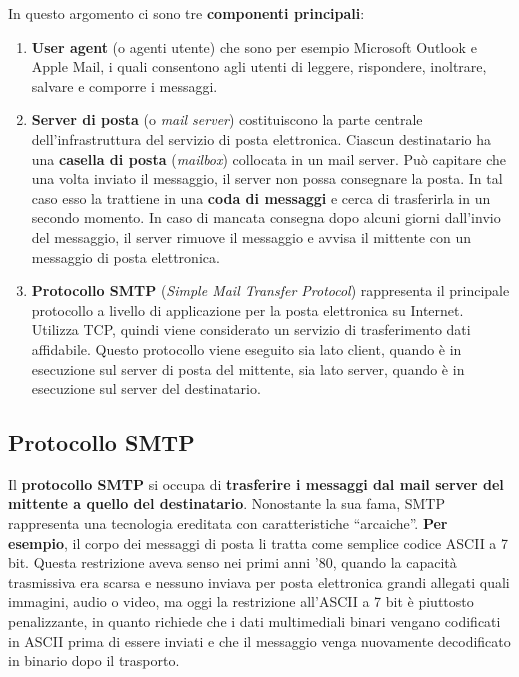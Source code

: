 \documentclass[a4paper]{article}
\newcommand{\dquotes}[1]{``#1''}
\begin{document}
	\noindent
	In questo argomento ci sono tre \textbf{componenti principali}:
	\begin{enumerate}
		\item \textbf{User agent} (o agenti utente) che sono per esempio Microsoft Outlook e Apple Mail, i quali consentono agli utenti di leggere, rispondere, inoltrare, salvare e comporre i messaggi.
		
		\item \textbf{Server di posta} (o \emph{mail server}) costituiscono la parte centrale dell’infrastruttura del servizio di posta elettronica. Ciascun destinatario ha una \textbf{casella di posta} (\emph{mailbox}) collocata in un mail server.\newline
		Può capitare che una volta inviato il messaggio, il server non possa consegnare la posta. In tal caso esso la trattiene in una \textbf{coda di messaggi} e cerca di trasferirla in un secondo momento. In caso di mancata consegna dopo alcuni giorni dall’invio del messaggio, il server rimuove il messaggio e avvisa il mittente con un messaggio di posta elettronica.
		
		\item \textbf{Protocollo SMTP} (\emph{Simple Mail Transfer Protocol}) rappresenta il principale protocollo a livello di applicazione per la posta elettronica su Internet. Utilizza TCP, quindi viene considerato un servizio di trasferimento dati affidabile.\newline
		Questo protocollo viene eseguito sia lato client, quando è in esecuzione sul server di posta del mittente, sia lato server, quando è in esecuzione sul server del destinatario.
	\end{enumerate}

	\newpage

	\subsection{Protocollo SMTP}
	
	Il \textcolor{Red3}{\textbf{protocollo SMTP}} si occupa di \textbf{trasferire i messaggi dal mail server del mittente a quello del destinatario}. Nonostante la sua fama, SMTP rappresenta una tecnologia ereditata con caratteristiche \dquotes{arcaiche}.\newline
	\textbf{Per esempio}, il corpo dei messaggi di posta li tratta come semplice codice ASCII a 7 bit. Questa restrizione aveva senso nei primi anni '80, quando la capacità trasmissiva era scarsa e nessuno inviava per posta elettronica grandi allegati quali immagini, audio o video, ma oggi la restrizione all’ASCII a 7 bit è piuttosto penalizzante, in quanto richiede che i dati multimediali binari vengano codificati in ASCII prima di essere inviati e che il messaggio venga nuovamente decodificato in binario dopo il trasporto.\newline
	
\end{document}
